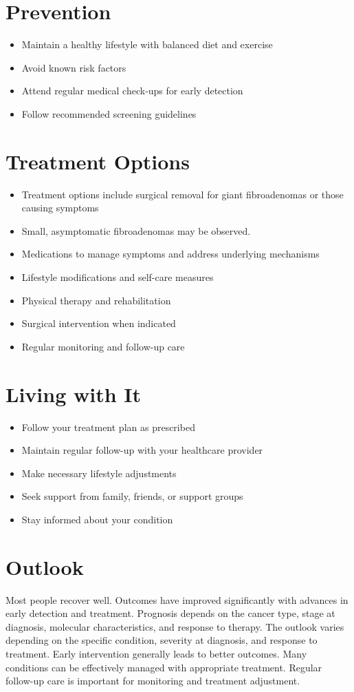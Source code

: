 \section{Prevention}
\begin{itemize}[noitemsep]
  \item Maintain a healthy lifestyle with balanced diet and exercise
  \item Avoid known risk factors
  \item Attend regular medical check-ups for early detection
  \item Follow recommended screening guidelines
\end{itemize}
\section{Treatment Options}
\begin{itemize}[noitemsep]
  \item Treatment options include surgical removal for giant fibroadenomas or those causing symptoms
  \item Small, asymptomatic fibroadenomas may be observed.
  \item Medications to manage symptoms and address underlying mechanisms
  \item Lifestyle modifications and self-care measures
  \item Physical therapy and rehabilitation
  \item Surgical intervention when indicated
  \item Regular monitoring and follow-up care
\end{itemize}
\section{Living with It}
\begin{itemize}[noitemsep]
  \item Follow your treatment plan as prescribed
  \item Maintain regular follow-up with your healthcare provider
  \item Make necessary lifestyle adjustments
  \item Seek support from family, friends, or support groups
  \item Stay informed about your condition
\end{itemize}
\section{Outlook}
Most people recover well. Outcomes have improved significantly with advances in early detection and treatment. Prognosis depends on the cancer type, stage at diagnosis, molecular characteristics, and response to therapy. The outlook varies depending on the specific condition, severity at diagnosis, and response to treatment. Early intervention generally leads to better outcomes. Many conditions can be effectively managed with appropriate treatment. Regular follow-up care is important for monitoring and treatment adjustment.
